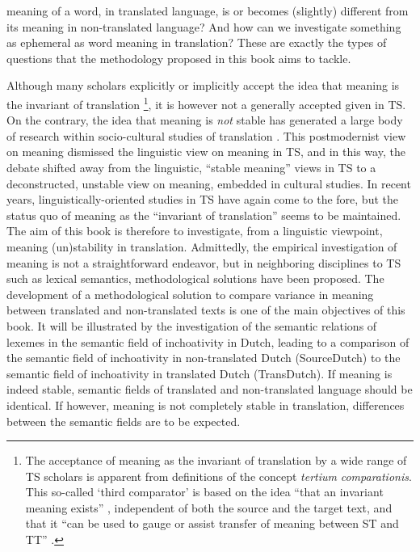 meaning of a word, in translated language, is or becomes (slightly) different from its meaning in non-translated language? And how can we investigate something as ephemeral as word meaning in translation? These are exactly the types of questions that the methodology proposed in this book aims to tackle.

Although many scholars explicitly or implicitly accept the idea that meaning is the invariant of translation  \footnote{The acceptance of meaning as the invariant of translation by a wide range of TS scholars is apparent from definitions of the concept \textit{tertium} \textit{comparationis}. This so-called ‘third comparator’ is based on the idea “that an invariant meaning exists” \citep[31]{Hatim & Munday 2004}, independent of both the source and the target text, and that it “can be used to gauge or assist transfer of meaning between ST and TT” \citep[31]{Hatim & Munday 2004}.}, it is however not a generally accepted given in TS. On the contrary, the idea that meaning is \textit{not} stable has generated a large body of research within socio-cultural studies of translation  \citep{baumgarten_ideology_2012}. This postmodernist view on meaning dismissed the linguistic view on meaning in TS, and in this way, the debate shifted away from the linguistic, “stable meaning” views in TS to a deconstructed, unstable view on meaning, embedded in cultural studies. In recent years, linguistically-oriented studies in TS have again come to the fore, but the status quo of meaning as the “invariant of translation” seems to be maintained. The aim of this book is therefore to investigate, from a linguistic viewpoint, meaning (un)stability in translation. Admittedly, the empirical investigation of meaning is not a straightforward endeavor, but in neighboring disciplines to TS such as lexical semantics, methodological solutions have been proposed. The development of a methodological solution to compare variance in meaning between translated and non-translated texts is one of the main objectives of this book. It will be illustrated by the investigation of the semantic relations of lexemes in the semantic field of inchoativity in Dutch, leading to a comparison of the semantic field of inchoativity in non-translated Dutch (SourceDutch) to the semantic field of inchoativity in translated Dutch (TransDutch). If meaning is indeed stable, semantic fields of translated and non-translated language should be identical. If however, meaning is not completely stable in translation, differences between the semantic fields are to be expected. 

